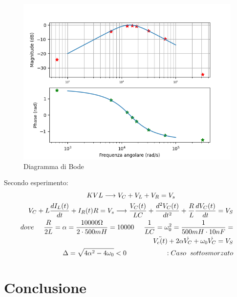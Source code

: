     \begin{figure}[!h]
        \begin{center}
            \includegraphics[width = 12 cm]{bode.png}
            \caption{Diagramma di Bode}
        \end{center}
    \end{figure}


    Secondo esperimento:
    \begin{equation}
        \begin{split}
            KVL \longrightarrow V_C + V_L + V_R = V_s \hspace{3cm}
            \\
            V_C + L\frac{dI_L(t)}{dt} + I_R(t)R = V_s \longrightarrow
            \frac{V_C(t)}{LC} + \frac{d^2V_C(t)}{dt^2} + \frac{R}{L} \frac{dV_C(t)}{dt} = V_S
            \\
            dove \hspace{0.5cm} \frac{R}{2L} = \alpha = \frac{10000\Omega}{2\cdot 500mH} = 10000 \hspace{0.5cm} \frac{1}{LC} = \omega_0^2 = \frac{1}{500mH \cdot 10nF} = 
            \\
            \ddot{V_c(t)} + 2\alpha \dot{V_C} + \omega_0 \dot{V_C} = V_S
            \\
            \Delta = \sqrt{4\alpha^2-4\omega_0} < 0 \hspace{2cm} :Caso \hspace{0.2cm} sottosmorzato
        \end{split}
    \end{equation}

    \section{Conclusione}

